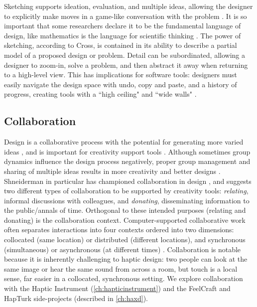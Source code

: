 Sketching supports ideation, evaluation, and multiple ideas,
allowing the designer to
explicitly make moves in a game-like conversation with the problem \cite{Schon1982}.
It is so important that some researchers declare it to be the fundamental language of design, like mathematics is the language for scientific thinking \cite{Cross2006}.
The power of sketching, according to Cross, is contained in its ability to describe a partial model of a proposed design or problem.
Detail can be subordinated, allowing a designer to zoom-in, solve a problem, and then
abstract it away when returning to a high-level view.
This has implications for software tools: designers must easily navigate the design space with undo, copy and paste, and a history of progress, creating tools with a ``high ceiling" and ``wide walls" \cite{Resnick2008}.


\subsection{Collaboration}
Design is a collaborative process with the potential for generating more varied ideas \cite{Warr2005}, and is important for creativity support tools \cite{Resnick2008,Shneiderman2000}.
Although sometimes group dynamics influence the design process negatively, proper group management and sharing of multiple ideas results in more creativity and better designs \cite{Herring2009}.
Shneiderman in particular has championed collaboration in design \cite{Shneiderman2000}, and suggests two different types of collaboration to be supported by creativity tools: \emph{relating}, informal discussions with colleagues, and \emph{donating}, disseminating information to the public/annals of time.
Orthogonal to these intended purposes (relating and donating) is the collaboration context.
Computer-supported collaborative work often separates interactions into four contexts ordered into two dimensions: collocated (same location) or distributed (different locations), and synchronous (simultaneous)  or asynchronous (at different times) \cite{Ellis1991}.
Collaboration is notable because it is inherently challenging to haptic design: two people can look at the same image or hear the same sound from across a room, but touch is a local sense, far easier in a collocated, synchronous setting.
We explore collaboration with the Haptic Instrument (\autoref{ch:hapticinstrument}) and the FeelCraft and HapTurk side-projects (described in \autoref{ch:haxd}).


